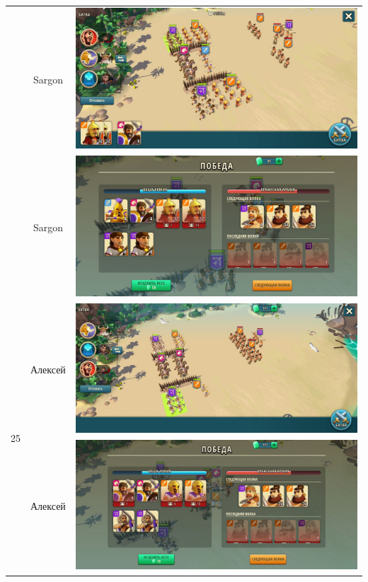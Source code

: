 \begin{longtable}{|c|c|c|}
    & Sargon &
    \includegraphics[width=0.75\linewidth]{./parts/media/TreasureHunt/25/sargon/photo_2022-04-07_09-58-16.jpg} \\
    & Sargon &
    \includegraphics[width=0.75\linewidth]{./parts/media/TreasureHunt/25/sargon/photo_2022-04-07_09-58-27.jpg} \\
    \hline
    \multirow{10}{*}{25} & Алексей &
    \includegraphics[width=0.75\linewidth]{./parts/media/TreasureHunt/25/alexey/photo_2022-04-07_10-09-19.jpg} \\
    & Алексей &
    \includegraphics[width=0.75\linewidth]{./parts/media/TreasureHunt/25/alexey/photo_2022-04-07_10-09-08.jpg} \\

\end{longtable}
